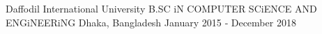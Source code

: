 
\begin{cventries}
\cventry
    {Daffodil International University}
    {B.SC iN COMPUTER SCiENCE AND ENGiNEERiNG}
    {Dhaka, Bangladesh}
    {January 2015 ‑ December 2018}
    {
    }
    {}
\end{cventries}
